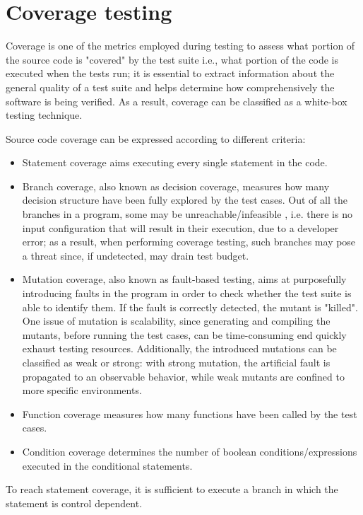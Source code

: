 \section{Coverage testing}
Coverage is one of the metrics employed during testing to assess what portion of the source code is "covered" by the test suite i.e., 
what portion of the code is executed when the tests run; it is essential to extract information about the general quality of a test suite and helps determine how comprehensively the software is being verified. As a result, coverage can be classified as a white-box testing technique.

Source code coverage can be expressed according to different criteria:
\begin {itemize}
    \item Statement coverage aims executing every single statement in the code.
    \item Branch coverage, also known as decision coverage, measures how many decision structure have been fully explored by the test cases. Out of all the branches in a program, some may be unreachable/infeasible \cite{DBLP:conf/issta/YatesM89}, i.e. there is no input configuration that will result in their execution, due to a developer error; as a result, when performing coverage testing, such branches may pose a threat since, if undetected, may drain test budget.
    \item Mutation coverage, also known as fault-based testing, aims at purposefully introducing faults in the program in order to 
            check whether the test suite is able to identify them. If the fault is correctly detected, the mutant is "killed".
            One issue of mutation is scalability, since generating and compiling the mutants, before running the test cases, can be time-consuming end quickly exhaust testing resources. Additionally, the introduced mutations can be classified as weak or strong: with strong mutation, the artificial fault is propagated to an observable behavior, while weak mutants are confined to more 
            specific environments.
    \item Function coverage measures how many functions have been called by the test cases.
    \item Condition coverage determines the number of boolean conditions/expressions executed in the conditional statements.
\end {itemize}
To reach statement coverage, it is sufficient to execute a branch in which the statement is control dependent.

